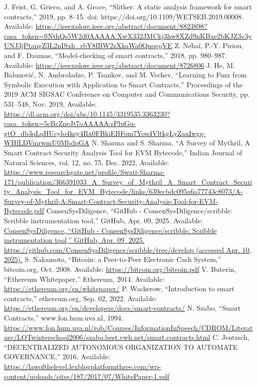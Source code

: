 \documentclass[conference]{IEEEtran}
\begin{document}
\begin{thebibliography}{00}
 J. Feist, G. Grieco, and A. Groce, “Slither: A static analysis framework for smart contracts,” 2019, pp. 8–15. doi: https://doi.org/10.1109/WETSEB.2019.00008. Available: \url{https://ieeexplore.ieee.org/abstract/document/8823898?casa_token=SNthQs5W2d0AAAAA:XwX332JMCkj3hw8XZd9nKBxe2bKJZ3v3yUNJ3jPtangZ3L2nISxh_rbY8fBW2zXkaWa0QnqgqVE}
 Z. Nehaï, P.-Y. Piriou, and F. Daumas, “Model-checking of smart contracts,” 2018, pp. 980–987. Available: \url{https://ieeexplore.ieee.org/abstract/document/8726806}
 J. He, M. Balunović, N. Ambroladze, P. Tsankov, and M. Vechev, “Learning to Fuzz from Symbolic Execution with Application to Smart Contracts,” Proceedings of the 2019 ACM SIGSAC Conference on Computer and Communications Security, pp. 531–548, Nov. 2019, Available: \url{https://dl.acm.org/doi/abs/10.1145/3319535.3363230?casa_token=5cBcZneJt7oAAAAA:sPluGu-gtO_db3qLqHUcylo4ksy4Rx0FBkiEBFom7You4VltkgLyZanIwgg-WHfLDVmrwmU0MbdpGA}
 N. Sharma and S. Sharma, “A Survey of Mythril, A Smart Contract Security Analysis Tool for EVM Bytecode,” Indian Journal of Natural Sciences, vol. 12, no. 75, Dec. 2022, Available:
\url{https://www.researchgate.net/profile/Swati-Sharma-171/publication/366391033_A_Survey_of_Mythril_A_Smart_Contract_Security_Analysis_Tool_for_EVM_Bytecode/links/639ecbdc095a6a77743c8073/A-Survey-of-Mythril-A-Smart-Contract-Security-Analysis-Tool-for-EVM-Bytecode.pdf}
 ConsenSysDiligence, “GitHub - ConsenSysDiligence/scribble: Scribble instrumentation tool,” GitHub, Apr. 09, 2025. Available:  
\url{ConsenSysDiligence, “GitHub - ConsenSysDiligence/scribble: Scribble instrumentation tool,” GitHub, Apr. 09, 2025. https://github.com/ConsenSysDiligence/scribble/tree/develop (accessed Apr. 10, 2025).}
 S. Nakamoto, “Bitcoin: a Peer-to-Peer Electronic Cash System,” bitcoin.org, Oct. 2008. Available: 
\url{https://bitcoin.org/bitcoin.pdf}
 V. Buterin, “Ethereum Whitepaper,” Ethereum, 2014. Available: 
\url{https://ethereum.org/en/whitepaper/}
 P. Wackerow, “Introduction to smart contracts,” ethereum.org, Sep. 02, 2022. Available: 
\url{https://ethereum.org/en/developers/docs/smart-contracts/}
 N. Szabo, “Smart Contracts,” www.fon.hum.uva.nl, 1994. 
\url{https://www.fon.hum.uva.nl/rob/Courses/InformationInSpeech/CDROM/Literature/LOTwinterschool2006/szabo.best.vwh.net/smart.contracts.html}
 C. Jentzsch, “DECENTRALIZED AUTONOMOUS ORGANIZATION TO AUTOMATE GOVERNANCE,” 2016. Available: 
\url{https://lawofthelevel.lexblogplatformthree.com/wp-content/uploads/sites/187/2017/07/WhitePaper-1.pdf}

\end{thebibliography}
\end{document}
